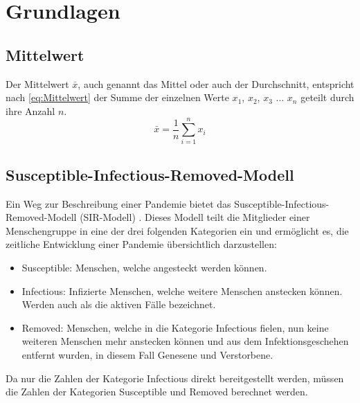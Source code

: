 \chapter{Grundlagen}\label{chap:Grundlagen}

\section{Mittelwert}\label{sec:Grundlagen:Mittelwert}
Der Mittelwert $\bar x$, auch genannt das Mittel oder auch der Durchschnitt, entspricht nach \autoref{eq:Mittelwert} der Summe der einzelnen Werte $x_1$, $x_2$, $x_3$ ... $x_n$ geteilt durch ihre Anzahl $n$.
\begin{equation}\label{eq:Mittelwert}
    \bar x = \frac{1}{n}\sum_{i=1}^n x_i
\end{equation}

\section{Susceptible-Infectious-Removed-Modell}\label{sec:Grundlagen:SIR}
Ein Weg zur Beschreibung einer Pandemie bietet das \glqq{}Susceptible-Infectious-Removed-Modell\grqq{} (SIR-Modell) \autocite{SIR}. Dieses Modell teilt die Mitglieder einer Menschengruppe in eine der drei folgenden Kategorien ein und ermöglicht es, die zeitliche Entwicklung einer Pandemie übersichtlich darzustellen:
\begin{itemize}
    \item \glqq{}Susceptible\grqq{}: Menschen, welche angesteckt werden können.
    \item \glqq{}Infectious\grqq{}: Infizierte Menschen, welche weitere Menschen anstecken können. Werden auch als \glqq{}die aktiven Fälle\grqq{} bezeichnet.
    \item \glqq{}Removed\grqq{}: Menschen, welche in die Kategorie \glqq{}Infectious\grqq{} fielen, nun keine weiteren Menschen mehr anstecken können und aus dem Infektionsgeschehen entfernt wurden,
    in diesem Fall Genesene und Verstorbene. 
\end{itemize}

Da nur die Zahlen der Kategorie \glqq{}Infectious\grqq{} direkt bereitgestellt werden, müssen die Zahlen der Kategorien \glqq{}Susceptible\grqq{} und \glqq{}Removed\grqq{} berechnet werden.

